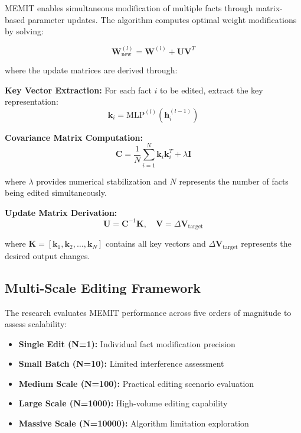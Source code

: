 MEMIT enables simultaneous modification of multiple facts through matrix-based parameter updates. The algorithm computes optimal weight modifications by solving:

\begin{equation}
\mathbf{W}^{(l)}_{\text{new}} = \mathbf{W}^{(l)} + \mathbf{U} \mathbf{V}^T
\end{equation}

where the update matrices are derived through:

\textbf{Key Vector Extraction:}
For each fact $i$ to be edited, extract the key representation:
\begin{equation}
\mathbf{k}_i = \text{MLP}^{(l)}(\mathbf{h}_i^{(l-1)})
\end{equation}

\textbf{Covariance Matrix Computation:}
\begin{equation}
\mathbf{C} = \frac{1}{N} \sum_{i=1}^{N} \mathbf{k}_i \mathbf{k}_i^T + \lambda \mathbf{I}
\end{equation}

where $\lambda$ provides numerical stabilization and $N$ represents the number of facts being edited simultaneously.

\textbf{Update Matrix Derivation:}
\begin{equation}
\mathbf{U} = \mathbf{C}^{-1} \mathbf{K}, \quad \mathbf{V} = \Delta \mathbf{V}_{\text{target}}
\end{equation}

where $\mathbf{K} = [\mathbf{k}_1, \mathbf{k}_2, \ldots, \mathbf{k}_N]$ contains all key vectors and $\Delta \mathbf{V}_{\text{target}}$ represents the desired output changes.

\subsection{Multi-Scale Editing Framework}

The research evaluates MEMIT performance across five orders of magnitude to assess scalability:

\begin{itemize}
    \item \textbf{Single Edit (N=1):} Individual fact modification precision
    \item \textbf{Small Batch (N=10):} Limited interference assessment  
    \item \textbf{Medium Scale (N=100):} Practical editing scenario evaluation
    \item \textbf{Large Scale (N=1000):} High-volume editing capability
    \item \textbf{Massive Scale (N=10000):} Algorithm limitation exploration
\end{itemize}

